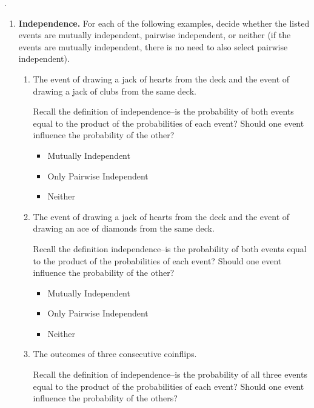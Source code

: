 \documentclass[11pt, preview]{standalone} %
\date{} %
\begin{document}
.

\begin{enumerate}
\item {\bf Independence.} For each of the following examples, decide whether the listed events are mutually independent, pairwise independent, or neither (if the events are mutually independent, there is no need to also select pairwise independent).
\begin{enumerate}
\item The event of drawing a jack of hearts from the deck and the event of drawing a jack of clubs from the same deck. 
\begin{Multi}
Recall the definition of independence--is the probability of both events equal to the product of the probabilities of each event? Should one event influence the probability of the other?
\begin{itemize}
\FalseChoice\item Mutually Independent
\FalseChoice\item Only Pairwise Independent
\TrueChoice\item Neither
\end{itemize}
\end{Multi}
\item The event of drawing a jack of hearts from the deck and the event of drawing an ace of diamonds from the same deck. 
\begin{Multi}
Recall the definition independence--is the probability of both events equal to the product of the probabilities of each event? Should one event influence the probability of the other?
\begin{itemize}
\FalseChoice\item Mutually Independent
\FalseChoice\item Only Pairwise Independent
\TrueChoice\item Neither
\end{itemize}
\end{Multi}
\item The outcomes of three consecutive coinflips.
\begin{Multi}
Recall the definition of independence--is the probability of all three events equal to the product of the probabilities of each event? Should one event influence the probability of the others?

\end{Multi}
\end{enumerate}
\end{enumerate}
\end{document}
